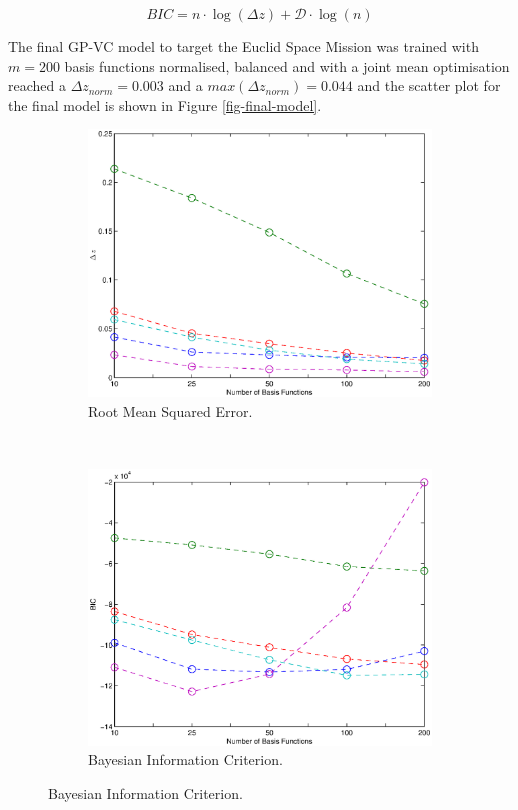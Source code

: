 \documentclass[useAMS,usenatbib,fleqn]{mn2e}
\begin{document}
\begin{equation}
\label{eq-bic}
BIC = n \cdot \log(\Delta z)+\mathcal{D}\cdot \log(n)
\end{equation}

The final GP-VC model to target the Euclid Space Mission was trained with $m=200$ basis functions normalised, balanced and with a joint mean optimisation reached a $\Delta z_{norm}=0.003$ and a  $max(\Delta z_{norm})=0.044$ and the scatter plot for the final model is shown in Figure \ref{fig-final-model}.

\begin{figure}
        \centering
        
        \begin{subfigure}[b]{0.45\textwidth}
                \includegraphics[width=\textwidth]{figures/different-basis.eps}
                 \caption{Root Mean Squared Error.} 
                 \label{fig-rmses}
        \end{subfigure}
	~
       \begin{subfigure}[b]{0.45\textwidth}
                \includegraphics[width=\textwidth]{figures/BIC.eps}
                 \caption{Bayesian Information Criterion.} 
                 \label{fig-bic}
        \end{subfigure}


\end{figure}
\end{document}
